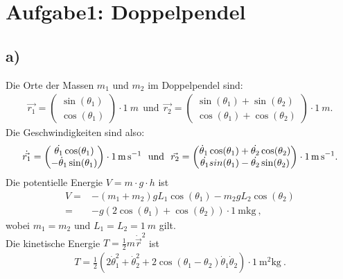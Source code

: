 
\section*{Aufgabe1: Doppelpendel}
\subsection*{a)}
Die Orte der Massen $m_1$ und $m_2$ im Doppelpendel sind:
\begin{align}
\vec{r_1}=\begin{pmatrix}\sin(\theta_1)\\\cos(\theta_1)\end{pmatrix}
\cdot\SI{1}{m}~~\text{und}~~
\vec{r_2}=\begin{pmatrix}\sin(\theta_1)+\sin(\theta_2)\\\cos(\theta_1)+\cos(\theta_2)\end{pmatrix}\cdot\SI{1}{m}.
\end{align}
Die Geschwindigkeiten sind also:
\begin{align}
\dot{\vec{r_1}}=\begin{pmatrix}\dot{\theta_1}\cos(\theta_1)\\-\dot\theta_1\sin(\theta_1)\end{pmatrix}\cdot\SI{1}{\meter\per\second}
~~\text{und}~~
\vec{r_2}=\begin{pmatrix}\dot\theta_1\cos(\theta_1)+\dot{\theta_2}\cos(\theta_2)\\\-\dot{\theta_1}sin(\theta_1)-\dot{\theta_2}\sin(\theta_2)\end{pmatrix}\cdot\SI{1}{\meter\per\second}.
\end{align}
Die potentielle Energie $V=m\cdot g\cdot h$ ist
\begin{align}
V=&-(m_1+m_2)gL_1\cos(\theta_1)-m_2gL_2\cos(\theta_2)\\
=&-g(2\cos(\theta_1)+\cos(\theta_2))\cdot\SI{1}{\meter\kilogram}~,
\end{align}
wobei $m_1=m_2$ und $L_1=L_2=\SI{1}{m}$ gilt.\\
Die kinetische Energie $T=\frac{1}{2}m{\dot{\vec{r}}}^2$ ist
\begin{align}
T=\frac{1}{2}\left(2\dot\theta_1^2+\dot\theta_2^2+2\cos(\theta_1-\theta_2)\dot\theta_1\dot\theta_2\right)\cdot\SI{1}{\square\meter\kilogram}~.
\end{align}

